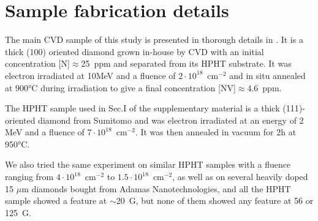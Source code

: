 \documentclass[9pt,twocolumn,twoside]{revtex4-1}
\begin{document}
\section{Sample fabrication details}
The main CVD sample of this study is presented in thorough details in \citep{TALLAIRE2020421}. It is a thick (100) oriented diamond grown in-house by CVD with an initial concentration [N]$\approx$25~ppm and separated from its HPHT substrate. It was electron irradiated at 10MeV and a fluence of $2\cdot 10^{18}$~cm$^{-2}$ and in situ annealed at 900°C during irradiation to give a final concentration [NV]$\approx$4.6~ppm.

The HPHT sample used in Sec.I of the supplementary material is a thick (111)-oriented diamond from Sumitomo and was electron irradiated at an energy of 2 MeV and a fluence of $7\cdot 10^{18}$~cm$^{-2}$. It was then annealed in vacuum for 2h at 950°C.

We also tried the same experiment on similar HPHT samples with a fluence ranging from $4\cdot 10^{18}$~cm$^{-2}$ to $1.5\cdot 10^{18}$~cm$^{-2}$, as well as on several heavily doped 15 $\mu$m diamonds bought from Adamas Nanotechnologies, and all the HPHT sample showed a feature at $\sim$20~G, but none of them showed any feature at 56 or 125~G.
\end{document}
